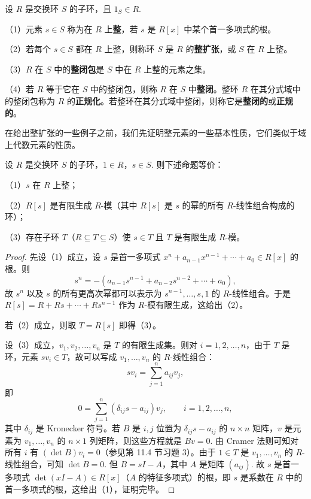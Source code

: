 \begin{definition}
设 \(R\) 是交换环 \(S\) 的子环，且 \(1_S \in R\).

（1）元素 \(s \in S\) 称为在 \(R\) 上\textbf{整}，若 \(s\) 是 \(R[x]\) 中某个首一多项式的根。

（2）若每个 \(s \in S\) 都在 \(R\) 上整，则称环 \(S\) 是 \(R\) 的\textbf{整扩张}，或 \(S\) 在 \(R\) 上整。

（3）\(R\) 在 \(S\) 中的\textbf{整闭包}是 \(S\) 中在 \(R\) 上整的元素之集。

（4）若 \(R\) 等于它在 \(S\) 中的整闭包，则称 \(R\) 在 \(S\) 中\textbf{整闭}。整环 \(R\) 在其分式域中的整闭包称为 \(R\) 的\textbf{正规化}。若整环在其分式域中整闭，则称它是\textbf{整闭的}或\textbf{正规的}。
\end{definition}

在给出整扩张的一些例子之前，我们先证明整元素的一些基本性质，它们类似于域上代数元素的性质。

\begin{proposition}\label{pro:15.23}
设 \(R\) 是交换环 \(S\) 的子环，\(1 \in R\)，\(s \in S\). 则下述命题等价：

（1）\(s\) 在 \(R\) 上整；

（2）\(R[s]\) 是有限生成 \(R\)-模（其中 \(R[s]\) 是 \(s\) 的幂的所有 \(R\)-线性组合构成的环）；

（3）存在子环 \(T\)（\(R \subseteq T \subseteq S\)）使 \(s \in T\) 且 \(T\) 是有限生成 \(R\)-模。
\end{proposition}

\begin{proof}
先设（1）成立，设 \(s\) 是首一多项式 \(x^n+a_{n-1}x^{n-1}+\cdots+a_0 \in R[x]\) 的根。则
\[
s^n = -(a_{n-1}s^{n-1}+a_{n-2}s^{n-2}+\cdots+a_0),
\]
故 \(s^n\) 以及 \(s\) 的所有更高次幂都可以表示为 \(s^{n-1}, \ldots, s, 1\) 的 \(R\)-线性组合。于是 \(R[s] = R+Rs+\cdots+Rs^{n-1}\) 作为 \(R\)-模有限生成，这给出（2）。

若（2）成立，则取 \(T = R[s]\) 即得（3）。

设（3）成立，\(v_1, v_2, \ldots, v_n\) 是 \(T\) 的有限生成集。则对 \(i = 1, 2, \ldots, n\)，由于 \(T\) 是环，元素 \(sv_i \in T\)，故可以写成 \(v_1, \ldots, v_n\) 的 \(R\)-线性组合：
\[
sv_i = \sum_{j=1}^{n}a_{ij}v_j,
\]
即
\[
0 = \sum_{j=1}^{n}(\delta_{ij}s-a_{ij})v_j, \qquad i = 1, 2, \ldots, n,
\]
其中 \(\delta_{ij}\) 是 Kronecker 符号。若 \(B\) 是 \(i, j\) 位置为 \(\delta_{ij}s-a_{ij}\) 的 \(n \times n\) 矩阵，\(v\) 是元素为 \(v_1, \ldots, v_n\) 的 \(n \times 1\) 列矩阵，则这些方程就是 \(Bv = 0\). 由 Cramer 法则可知对所有 \(i\) 有 \((\det B)v_i = 0\)（参见第 11.4 节习题 3）。由于 \(1 \in T\) 是 \(v_1, \ldots, v_n\) 的 \(R\)-线性组合，可知 \(\det B = 0\). 但 \(B = sI-A\)，其中 \(A\) 是矩阵 \((a_{ij})\). 故 \(s\) 是首一多项式 \(\det(xI-A) \in R[x]\)（\(A\) 的特征多项式）的根，即 \(s\) 是系数在 \(R\) 中的首一多项式的根，这给出（1），证明完毕。
\end{proof}

